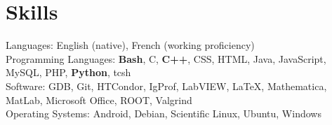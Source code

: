 \section{Skills} Languages: English (native), French (working proficiency) \\
Programming Languages: \textbf{Bash}, C, \textbf{C++}, CSS, HTML, Java, JavaScript, MySQL, PHP, \textbf{Python}, tcsh \\
Software: GDB, Git, HTCondor, IgProf, LabVIEW, \LaTeX, Mathematica, MatLab, Microsoft Office, ROOT, Valgrind \\
Operating Systems: Android, Debian, Scientific Linux, Ubuntu, Windows
